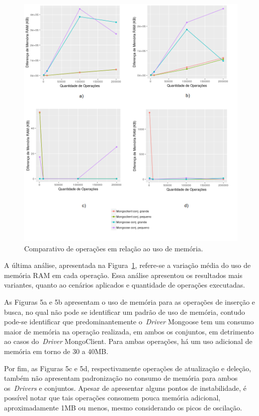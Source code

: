 \documentclass[12pt]{article}
\begin{document}
\begin{figure}[!ht]
    \centering
    \includegraphics[width=\textwidth]{images/memory}
    \caption{Comparativo de operações em relação ao uso de memória.}
    \label{fig:memory}
\end{figure}

A última análise, apresentada na Figura~\ref{fig:memory}, refere-se a variação média do uso de memória RAM em cada operação. 
Essa análise apresentou os resultados mais variantes, quanto ao cenários aplicados e quantidade de operações executadas.

As Figuras 5a e 5b apresentam o uso de memória para as operações de inserção e busca, no qual não pode se identificar um padrão de uso de memória, contudo pode-se identificar que predominantemente o~\emph{Driver} Mongoose tem um consumo maior de memória na operação realizada, em ambos os conjuntos, em detrimento ao casos do~\emph{Driver} MongoClient.
Para ambas operações, há um uso adicional de memória em torno de 30 a 40MB.

Por fim, as Figuras 5c e 5d, respectivamente operações de atualização e deleção, também não apresentam padronização no consumo de memória para ambos os~\emph{Drivers} e conjuntos. 
Apesar de apresentar alguns pontos de instabilidade, é possível notar que tais operações consomem pouca memória adicional, aproximadamente 1MB ou menos, mesmo considerando os picos de oscilação.
\end{document}
